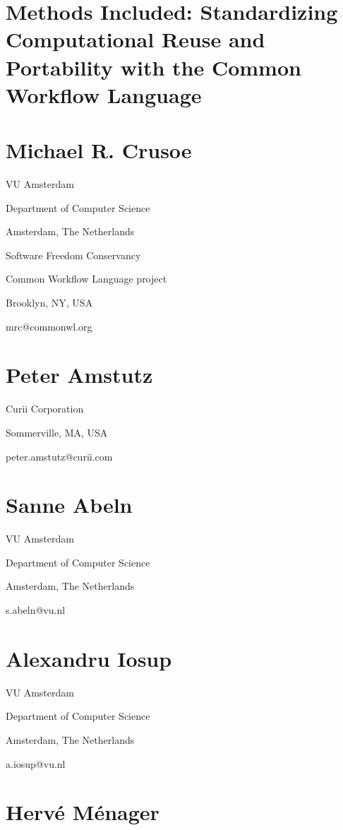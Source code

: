 \documentclass[
]{article}
\author{}
\date{}
\begin{document}
\section{Methods Included: Standardizing Computational Reuse and
Portability with the Common Workflow
Language}\label{methods-included-standardizing-computational-reuse-and-portability-with-the-common-workflow-language}

\section{Michael R. Crusoe}\label{michael-r.-crusoe}

VU Amsterdam

Department of Computer Science

Amsterdam, The Netherlands

Software Freedom Conservancy

Common Workflow Language project

Brooklyn, NY, USA

mrc@commonwl.org

\section{Peter Amstutz}\label{peter-amstutz}

Curii Corporation

Sommerville, MA, USA

peter.amstutz@curii.com

\section{Sanne Abeln}\label{sanne-abeln}

VU Amsterdam

Department of Computer Science

Amsterdam, The Netherlands

s.abeln@vu.nl

\section{Alexandru Iosup}\label{alexandru-iosup}

VU Amsterdam

Department of Computer Science

Amsterdam, The Netherlands

a.iosup@vu.nl

\section{Hervé Ménager}\label{hervuxe9-muxe9nager}
\end{document}

